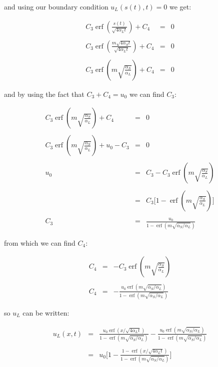 \documentclass{report}
\DeclareMathOperator{\erf}{erf}
\begin{document}
and using our boundary condition $u_L(s(t), t) = 0$ we get:\bigskip

\begin{eqnarray*}
                   C_3 \erf \left( \frac{s(t)}{\sqrt{4 \alpha_L t}} \right) + C_4 & = & 0 \\\\
  C_3 \erf \left( \frac{m \sqrt{4 \alpha_S t}}{\sqrt{4 \alpha_L t}} \right) + C_4 & = & 0 \\\\
                 C_3 \erf \left( m \sqrt{\frac{\alpha_S}{\alpha_L}} \right) + C_4 & = & 0 
\end{eqnarray*}\medskip

and by using the fact that $C_3 + C_4 = u_0$ we can find $C_3$:\bigskip

\begin{eqnarray*}
      C_3 \erf \left( m \sqrt{\frac{\alpha_S}{\alpha_L}} \right) + C_4 & = & 0 \\\\
C_3 \erf \left( m \sqrt{\frac{\alpha_S}{\alpha_L}} \right) + u_0 - C_3 & = & 0 \\\\
                                                                   u_0 & = & C_3 - C_3 \erf \left( m \sqrt{\frac{\alpha_S}{\alpha_L}} \right) \\\\ 
                                                                       & = & C_3 \Bigg[ 1 - \erf \left( m \sqrt{\frac{\alpha_S}{\alpha_L}} \right) \Bigg] \\\\
                                                                   C_3 & = & \frac{u_0}{1 - \erf \left( m \sqrt{ \alpha_S / \alpha_L} \right)} 
\end{eqnarray*}\medskip

from which we can find $C_4$:\bigskip

\begin{eqnarray*}
  C_4 & = & -C_3 \erf \left( m \sqrt{\frac{\alpha_S}{\alpha_L}} \right) \\\\
  C_4 & = & -\frac{u_0 \erf ( m \sqrt{ \alpha_S / \alpha_L } )}{1 - \erf ( m \sqrt{ \alpha_S / \alpha_L } )} 
\end{eqnarray*}\medskip

so $u_L$ can be written:\bigskip

\begin{eqnarray*}
  u_L(x, t) & = & \frac{u_0 \erf ( x / \sqrt{4 \alpha_L t} )}{1 - \erf ( m \sqrt{ \alpha_S / \alpha_L} )} - \frac{u_0 \erf ( m \sqrt{\alpha_S / \alpha_L} )}{1 - \erf ( m \sqrt{\alpha_S / \alpha_L} )} \\\\
            & = & u_0 \Bigg[ 1 - \frac{1 - \erf ( x / \sqrt{4 \alpha_L t} )}{1 - \erf ( m \sqrt{\alpha_S / \alpha_L} )}  \Bigg] 
\end{eqnarray*}\medskip
\end{document}
